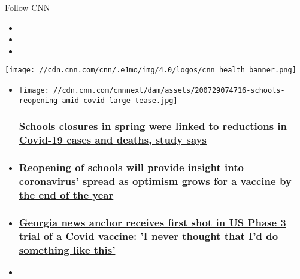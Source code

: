 Follow CNN

\begin{itemize}
\item
\item
\item
\end{itemize}

\texttt{[image: //cdn.cnn.com/cnn/.e1mo/img/4.0/logos/cnn\_health\_banner.png]}

\begin{itemize}
\item
  \href{/2020/07/29/health/school-closures-covid-jama-study-wellness/index.html}{}

  \texttt{[image: //cdn.cnn.com/cnnnext/dam/assets/200729074716-schools-reopening-amid-covid-large-tease.jpg]}

  \hypertarget{schools-closures-in-spring-were-linked-to-reductions-in-covid-19-cases-and-deaths-study-says}{%
  \subsubsection{\texorpdfstring{\href{/2020/07/29/health/school-closures-covid-jama-study-wellness/index.html}{Schools
  closures in spring were linked to reductions in Covid-19 cases and
  deaths, study
  says}}{Schools closures in spring were linked to reductions in Covid-19 cases and deaths, study says}}\label{schools-closures-in-spring-were-linked-to-reductions-in-covid-19-cases-and-deaths-study-says}}
\item
  \hypertarget{reopening-of-schools-will-provide-insight-into-coronavirus-spread-as-optimism-grows-for-a-vaccine-by-the-end-of-the-year-}{%
  \subsubsection{\texorpdfstring{\href{/2020/07/29/health/us-coronavirus-wednesday/index.html}{Reopening
  of schools will provide insight into coronavirus' spread as optimism
  grows for a vaccine by the end of the year
  }}{Reopening of schools will provide insight into coronavirus' spread as optimism grows for a vaccine by the end of the year }}\label{reopening-of-schools-will-provide-insight-into-coronavirus-spread-as-optimism-grows-for-a-vaccine-by-the-end-of-the-year-}}
\item
  \hypertarget{georgia-news-anchor-receives-first-shot-in-us-phase-3-trial-of-a-covid-vaccine-i-never-thought-that-id-do-something-like-this-}{%
  \subsubsection{\texorpdfstring{\href{/2020/07/27/health/coronavirus-vaccine-dawn-baker-feature/index.html}{Georgia
  news anchor receives first shot in US Phase 3 trial of a Covid
  vaccine: 'I never thought that I'd do something like this'
  }}{Georgia news anchor receives first shot in US Phase 3 trial of a Covid vaccine: 'I never thought that I'd do something like this' }}\label{georgia-news-anchor-receives-first-shot-in-us-phase-3-trial-of-a-covid-vaccine-i-never-thought-that-id-do-something-like-this-}}
\item
  \hypertarget{were-only-just-beginning-to-learn-how-covid-19-affects-the-brain}{%
}
\end{itemize}

